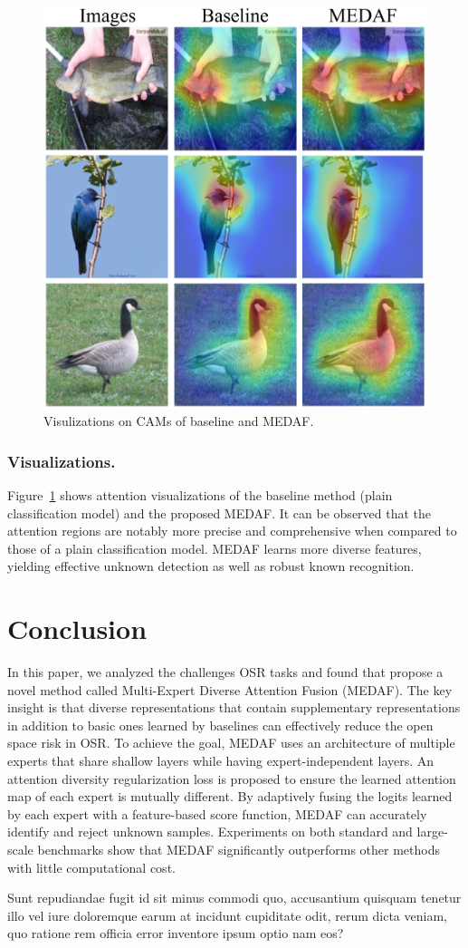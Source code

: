 \documentclass[letterpaper]{article} %
\begin{document}
\begin{figure}[t]
  \begin{center}
    \includegraphics[width=0.7\linewidth]{Figs/Fig_cam.pdf}
    \caption{Visulizations on CAMs of baseline and MEDAF.}
    \label{fig:Fig_cam}
    \end{center}
\end{figure}
\subsubsection{Visualizations.}
Figure~\ref{fig:Fig_cam} shows attention visualizations of the baseline method (plain classification model) and the proposed MEDAF. It can be observed that the attention regions are notably more precise and comprehensive when compared to those of a plain classification model. MEDAF learns more diverse features, yielding effective unknown detection as well as robust known recognition.

\section{Conclusion}
In this paper, we analyzed the challenges OSR tasks and found that propose a novel method called Multi-Expert Diverse Attention Fusion (MEDAF). The key insight is that diverse representations that contain supplementary representations in addition to basic ones learned by baselines can effectively reduce the open space risk in OSR. To achieve the goal, MEDAF uses an architecture of multiple experts that share shallow layers while having expert-independent layers. An attention diversity regularization loss is proposed to ensure the learned attention map of each expert is mutually different. By adaptively fusing the logits learned by each expert with a feature-based score function, MEDAF can accurately identify and reject unknown samples. Experiments on both standard and large-scale benchmarks show that MEDAF significantly outperforms other methods with little computational cost.

Sunt repudiandae fugit id sit minus commodi quo, accusantium quisquam tenetur illo vel iure doloremque earum at incidunt cupiditate odit, rerum dicta veniam, quo ratione rem officia error inventore ipsum optio nam eos?\clearpage

\end{document}
